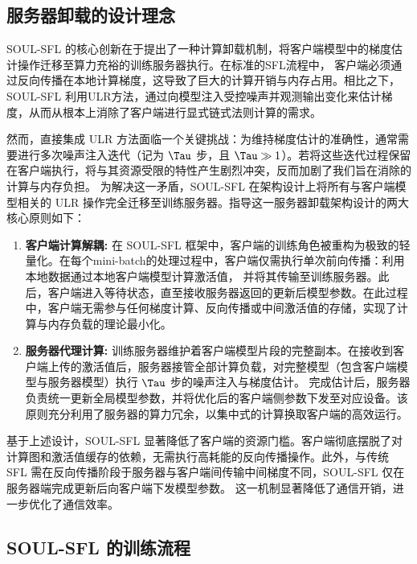 \subsection{服务器卸载的设计理念}
\label{subsec:design}

SOUL-SFL 的核心创新在于提出了一种计算卸载机制，将客户端模型中的梯度估计操作迁移至算力充裕的训练服务器执行。在标准的SFL流程中，
客户端必须通过反向传播在本地计算梯度，这导致了巨大的计算开销与内存占用。相比之下，SOUL-SFL 利用ULR方法，通过向模型注入受控噪声并观测输出变化来估计梯度，从而从根本上消除了客户端进行显式链式法则计算的需求。

然而，直接集成 ULR 方法面临一个关键挑战：为维持梯度估计的准确性，通常需要进行多次噪声注入迭代（记为 $\Tau$ 步，且 $\Tau \gg 1$）。若将这些迭代过程保留在客户端执行，将与其资源受限的特性产生剧烈冲突，反而加剧了我们旨在消除的计算与内存负担。
为解决这一矛盾，SOUL-SFL 在架构设计上将所有与客户端模型相关的 ULR 操作完全迁移至训练服务器。指导这一服务器卸载架构设计的两大核心原则如下：

\begin{enumerate}
    \item \textbf{客户端计算解耦:} 
    在 SOUL-SFL 框架中，客户端的训练角色被重构为极致的轻量化。在每个mini-batch的处理过程中，客户端仅需执行单次前向传播：利用本地数据通过本地客户端模型计算激活值，
    并将其传输至训练服务器。此后，客户端进入等待状态，直至接收服务器返回的更新后模型参数。在此过程中，客户端无需参与任何梯度计算、反向传播或中间激活值的存储，实现了计算与内存负载的理论最小化。
    
    \item \textbf{服务器代理计算:} 
    训练服务器维护着客户端模型片段的完整副本。在接收到客户端上传的激活值后，服务器接管全部计算负载，对完整模型（包含客户端模型与服务器模型）执行 $\Tau$ 步的噪声注入与梯度估计。
    完成估计后，服务器负责统一更新全局模型参数，并将优化后的客户端侧参数下发至对应设备。该原则充分利用了服务器的算力冗余，以集中式的计算换取客户端的高效运行。
\end{enumerate}

基于上述设计，SOUL-SFL 显著降低了客户端的资源门槛。客户端彻底摆脱了对计算图和激活值缓存的依赖，无需执行高耗能的反向传播操作。此外，与传统 SFL 需在反向传播阶段于服务器与客户端间传输中间梯度不同，SOUL-SFL 仅在服务器端完成更新后向客户端下发模型参数。
这一机制显著降低了通信开销，进一步优化了通信效率。
\subsection{SOUL-SFL 的训练流程}
\label{sec:protocol}

